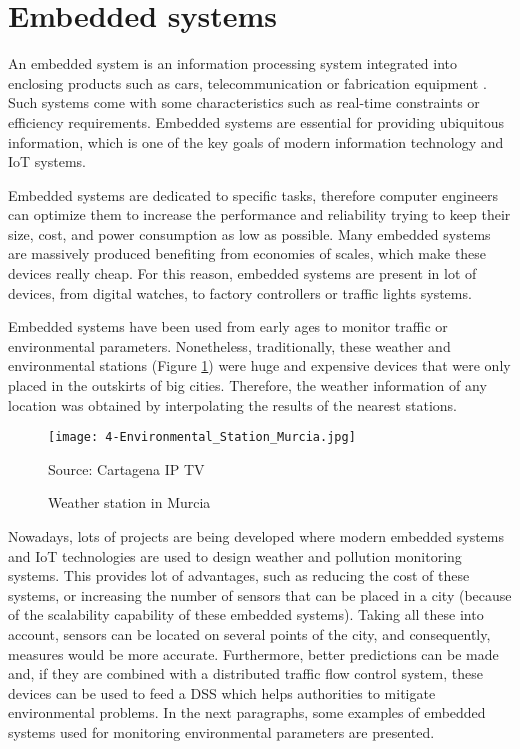 \newpage
\section{Embedded systems}
An embedded system is an information processing system integrated into enclosing products such as cars, telecommunication or fabrication equipment \cite{Mar16}. Such systems come with some characteristics such as real-time constraints or efficiency requirements. Embedded systems are essential for providing ubiquitous information, which is one of the key goals of modern information technology and \ac{IoT} systems.

Embedded systems are dedicated to specific tasks, therefore computer engineers can optimize them to increase the performance and reliability trying to keep their size, cost, and power consumption as low as possible. Many embedded systems are massively produced benefiting from economies of scales, which make these devices really cheap. For this reason, embedded systems are present in lot of devices, from digital watches, to factory controllers or traffic lights systems. 

Embedded systems have been used from early ages to monitor traffic or environmental parameters. Nonetheless, traditionally, these weather and environmental stations (Figure \ref{fig:4-Environmental_Station_Murcia}) were huge and expensive devices that were only placed in the outskirts of big cities. Therefore, the weather information of any location was obtained by interpolating the results of the nearest stations.

\begin{figure}[!h]
	\begin{center}
		\texttt{[image: 4-Environmental\_Station\_Murcia.jpg]}
		\caption{Weather station in Murcia}
		\label{fig:4-Environmental_Station_Murcia}{Source: Cartagena IP TV}
	\end{center}
\end{figure}

Nowadays, lots of projects are being developed where modern embedded systems and IoT technologies are used to design weather and pollution monitoring systems. This provides lot of advantages, such as reducing the cost of these systems, or increasing the number of sensors that can be placed in a city (because of the scalability capability of these embedded systems). Taking all these into account, sensors can be located on several points of the city, and consequently, measures would be more accurate. Furthermore, better predictions can be made and, if they are combined with a distributed traffic flow control system, these devices can be used to feed a \ac{DSS} which helps authorities to mitigate environmental problems. In the next paragraphs, some examples of embedded systems used for monitoring environmental parameters are presented.

